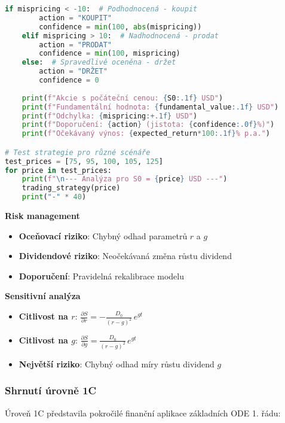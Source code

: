 \begin{example}
\begin{lstlisting}[language=Python, caption={Implementace Gordonova modelu v Pythonu}, label={lst:gordon}]
    if mispricing < -10:  # Podhodnocená - koupit
        action = "KOUPIT"
        confidence = min(100, abs(mispricing))
    elif mispricing > 10:  # Nadhodnocená - prodat
        action = "PRODAT"
        confidence = min(100, mispricing)
    else:  # Spravedlivě oceněna - držet
        action = "DRŽET"
        confidence = 0
    
    print(f"Akcie s počáteční cenou: {S0:.1f} USD")
    print(f"Fundamentální hodnota: {fundamental_value:.1f} USD")
    print(f"Odchylka: {mispricing:+.1f} USD")
    print(f"Doporučení: {action} (jistota: {confidence:.0f}%)")
    print(f"Očekávaný výnos: {expected_return*100:.1f}% p.a.")

# Test strategie pro různé scénáře
test_prices = [75, 95, 100, 105, 125]
for price in test_prices:
    print(f"\n--- Analýza pro S0 = {price} USD ---")
    trading_strategy(price)
    print("-" * 40)
\end{lstlisting}

\noindent\textbf{Risk management}
\begin{itemize}
\item \textbf{Oceňovací riziko}: Chybný odhad parametrů $r$ a $g$
\item \textbf{Dividendové riziko}: Neočekávaná změna růstu dividend
\item \textbf{Doporučení}: Pravidelná rekalibrace modelu
\end{itemize}

\noindent\textbf{Sensitivní analýza}
\begin{itemize}
\item \textbf{Citlivost na $r$}: $\displaystyle \frac{\partial S}{\partial r} = -\frac{D_0}{(r-g)^2}\,e^{gt}$
\item \textbf{Citlivost na $g$}: $\displaystyle \frac{\partial S}{\partial g} = \frac{D_0}{(r-g)^2}\,e^{gt}$
\item \textbf{Největší riziko}: Chybný odhad míry růstu dividend $g$
\end{itemize}
\end{example}

\subsubsection{Shrnutí úrovně 1C}
\label{sec:shrnuti-uroven-1c}

Úroveň 1C představila pokročilé finanční aplikace základních ODE 1. řádu:

